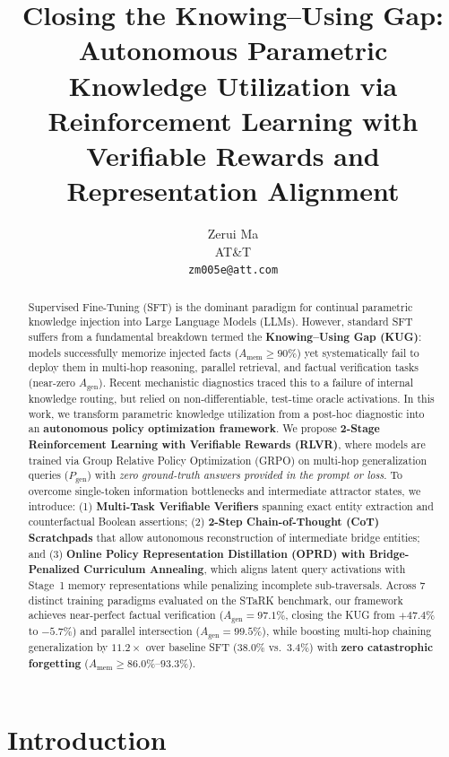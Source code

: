 \documentclass[11pt]{article}
\title{Closing the Knowing--Using Gap:\\
Autonomous Parametric Knowledge Utilization via\\
Reinforcement Learning with Verifiable Rewards and Representation Alignment}
\author{
  Zerui Ma \\
  AT\&T \\
  \texttt{zm005e@att.com}
}
\date{}
\newcommand{\Amem}{A_{\text{mem}}}
\newcommand{\Agen}{A_{\text{gen}}}
\theoremstyle{definition}
\begin{document}
\maketitle

\begin{abstract}
Supervised Fine-Tuning (SFT) is the dominant paradigm for continual parametric knowledge injection into Large Language Models (LLMs). However, standard SFT suffers from a fundamental breakdown termed the \textbf{Knowing--Using Gap (KUG)}: models successfully memorize injected facts ($\Amem \ge 90\%$) yet systematically fail to deploy them in multi-hop reasoning, parallel retrieval, and factual verification tasks (near-zero $\Agen$). 
Recent mechanistic diagnostics \cite{dai2025mem2gen} traced this to a failure of internal knowledge routing, but relied on non-differentiable, test-time oracle activations. 
In this work, we transform parametric knowledge utilization from a post-hoc diagnostic into an \textbf{autonomous policy optimization framework}. We propose \textbf{2-Stage Reinforcement Learning with Verifiable Rewards (RLVR)}, where models are trained via Group Relative Policy Optimization (GRPO) on multi-hop generalization queries ($P_{\text{gen}}$) with \emph{zero ground-truth answers provided in the prompt or loss}. 
To overcome single-token information bottlenecks and intermediate attractor states, we introduce:
(1) \textbf{Multi-Task Verifiable Verifiers} spanning exact entity extraction and counterfactual Boolean assertions;
(2) \textbf{2-Step Chain-of-Thought (CoT) Scratchpads} that allow autonomous reconstruction of intermediate bridge entities; and
(3) \textbf{Online Policy Representation Distillation (OPRD) with Bridge-Penalized Curriculum Annealing}, which aligns latent query activations with Stage~1 memory representations while penalizing incomplete sub-traversals.
Across 7 distinct training paradigms evaluated on the STaRK benchmark, our framework achieves near-perfect factual verification ($\Agen = \mathbf{97.1\%}$, closing the KUG from $+47.4\%$ to $\mathbf{-5.7\%}$) and parallel intersection ($\Agen = \mathbf{99.5\%}$), while boosting multi-hop chaining generalization by $\mathbf{11.2\times}$ over baseline SFT ($\mathbf{38.0\%}$ vs.\ $3.4\%$) with \textbf{zero catastrophic forgetting} ($\Amem \ge 86.0\%$--$93.3\%$).
\end{abstract}

\section{Introduction}\label{sec:intro}
\end{document}
